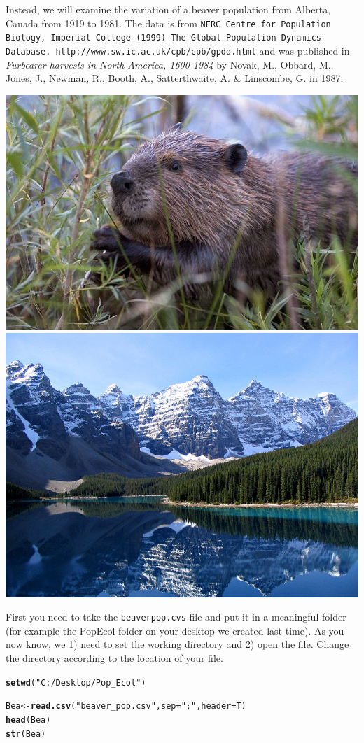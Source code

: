 \documentclass{article}\usepackage[]{graphicx}\usepackage[]{color}
\makeatletter
\newcommand{\hlstr}[1]{\textcolor[rgb]{0.192,0.494,0.8}{#1}}%
\newcommand{\hlstd}[1]{\textcolor[rgb]{0.345,0.345,0.345}{#1}}%
\newcommand{\hlkwb}[1]{\textcolor[rgb]{0.69,0.353,0.396}{#1}}%
\newcommand{\hlkwc}[1]{\textcolor[rgb]{0.333,0.667,0.333}{#1}}%
\newcommand{\hlkwd}[1]{\textcolor[rgb]{0.737,0.353,0.396}{\textbf{#1}}}%
\newenvironment{kframe}{%
 \def\at@end@of@kframe{}%
 \ifinner\ifhmode%
  \def\at@end@of@kframe{\end{minipage}}%
  \begin{minipage}{\columnwidth}%
 \fi\fi%
 \def\FrameCommand##1{\hskip\@totalleftmargin \hskip-\fboxsep
 \colorbox{shadecolor}{##1}\hskip-\fboxsep
     \hskip-\linewidth \hskip-\@totalleftmargin \hskip\columnwidth}%
 \MakeFramed {\advance\hsize-\width
   \@totalleftmargin\z@ \linewidth\hsize
   \@setminipage}}%
 {\par\unskip\endMakeFramed%
 \at@end@of@kframe}
\newenvironment{knitrout}{}{} %
\makeatother
\begin{document}
Instead, we will examine the variation of a beaver population from Alberta, Canada from 1919 to 1981. The data is from \texttt{NERC Centre for Population Biology, Imperial College (1999) The Global Population Dynamics Database. http://www.sw.ic.ac.uk/cpb/cpb/gpdd.html} and was published in \textit{Furbearer harvests in North America, 1600-1984} by Novak, M., Obbard, M., Jones, J., Newman, R., Booth, A., Satterthwaite, A. \& Linscombe, G. in 1987.  
\vspace{1.5ex}
\begin{center}
\includegraphics[height=0.35\textwidth]{Beaver.jpg}\includegraphics[height=0.35\textwidth]{Alberta.jpg}
\end{center}

First you need to take the \texttt{beaver\textunderscore pop.cvs} file and put it in a meaningful folder (for example the Pop\textunderscore Ecol folder on your desktop we created last time). As you now know, we 1) need to set the working directory and 2) open the file. Change the directory according to the location of your file.


\begin{knitrout}
\color{fgcolor}\begin{kframe}
\begin{alltt}
\hlkwd{setwd}\hlstd{(}\hlstr{"C:/Desktop/Pop_Ecol"}\hlstd{)}
\end{alltt}
\end{kframe}
\end{knitrout}

\begin{knitrout}
\color{fgcolor}\begin{kframe}
\begin{alltt}
\hlstd{Bea} \hlkwb{<-} \hlkwd{read.csv}\hlstd{(}\hlstr{"beaver_pop.csv"}\hlstd{,} \hlkwc{sep}\hlstd{=}\hlstr{";"}\hlstd{,} \hlkwc{header}\hlstd{=T)}
\hlkwd{head}\hlstd{(Bea)}
\hlkwd{str}\hlstd{(Bea)}
\end{alltt}
\end{kframe}
\end{knitrout}
\end{document}
